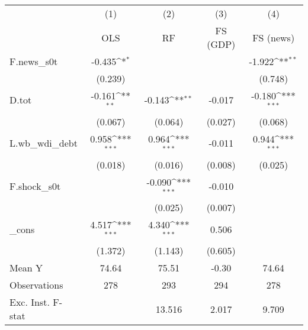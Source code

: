 {
\def\sym#1{\ifmmode^{#1}\else\(^{#1}\)\fi}
\begin{tabular}{l*{4}{c}}
\toprule
            &\multicolumn{1}{c}{(1)}&\multicolumn{1}{c}{(2)}&\multicolumn{1}{c}{(3)}&\multicolumn{1}{c}{(4)}\\
            &\multicolumn{1}{c}{OLS}&\multicolumn{1}{c}{RF}&\multicolumn{1}{c}{FS (GDP)}&\multicolumn{1}{c}{FS (news)}\\
\midrule
F.news\_s0t  &      -0.435\sym{*}  &                     &                     &      -1.922\sym{**} \\
            &     (0.239)         &                     &                     &     (0.748)         \\
\addlinespace
D.tot       &      -0.161\sym{**} &      -0.143\sym{**} &      -0.017         &      -0.180\sym{***}\\
            &     (0.067)         &     (0.064)         &     (0.027)         &     (0.068)         \\
\addlinespace
L.wb\_wdi\_debt&       0.958\sym{***}&       0.964\sym{***}&      -0.011         &       0.944\sym{***}\\
            &     (0.018)         &     (0.016)         &     (0.008)         &     (0.025)         \\
\addlinespace
F.shock\_s0t &                     &      -0.090\sym{***}&      -0.010         &                     \\
            &                     &     (0.025)         &     (0.007)         &                     \\
\addlinespace
\_cons      &       4.517\sym{***}&       4.340\sym{***}&       0.506         &                     \\
            &     (1.372)         &     (1.143)         &     (0.605)         &                     \\
\midrule
Mean Y      &       74.64         &       75.51         &       -0.30         &       74.64         \\
Observations&         278         &         293         &         294         &         278         \\
Exc. Inst. F-stat&                     &      13.516         &       2.017         &       9.709         \\
\bottomrule
\end{tabular}
}
